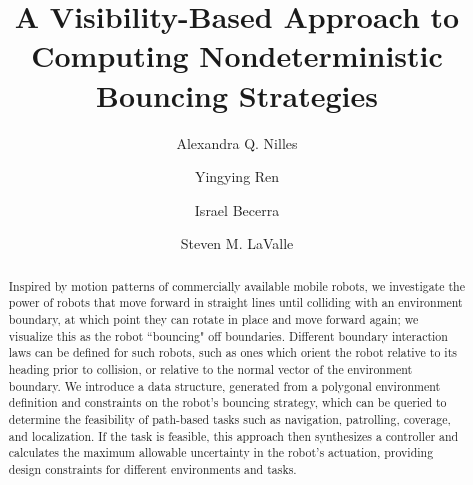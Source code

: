 \documentclass[]{styles/svproc}  %
\begin{document}
\mainmatter              %


\title{A Visibility-Based Approach to Computing Nondeterministic Bouncing
Strategies}

\author{Alexandra Q. Nilles \and Yingying Ren \and Israel
Becerra \and Steven M. LaValle%
}


\maketitle

\begin{abstract}
Inspired by motion patterns of commercially available mobile robots, we investigate the power of robots that 
move forward in straight lines
until colliding with an environment boundary, at which point they can rotate in
place and move forward again; we visualize this as the robot ``bouncing" off
boundaries. Different boundary interaction laws can be
defined for such robots, such as ones which orient the robot relative to its
heading prior to collision, or relative to the normal vector of the environment
boundary. We introduce a data structure, generated from a polygonal environment
 definition and constraints on the robot's bouncing strategy, which can be
queried to determine the feasibility of path-based tasks such as navigation,
patrolling, coverage, and localization. If the task is feasible, this
approach then synthesizes a controller and calculates the maximum allowable 
uncertainty in the robot's actuation, providing design constraints for different 
environments and tasks.
\end{abstract}
\end{document}
